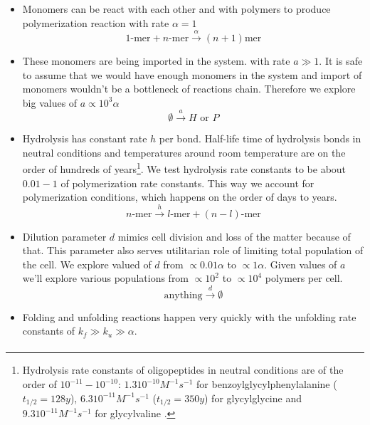 \documentclass[5p,times]{elsarticle}
\newcommand*{\ga}{\alpha}
\begin{document}
\begin{itemize}
 \item Monomers can be react with each other and with polymers to produce polymerization reaction 
with rate 
$\ga = 1$
\begin{equation}
 1\mbox{-mer}+n\mbox{-mer} \xrightarrow{\ga} (n+1)\mbox{mer}
\end{equation}
\item These monomers are being imported in the system. with rate $a\gg1$. It is safe to assume 
that 
we would have enough monomers in the system and import of monomers wouldn't be a bottleneck of 
reactions chain. Therefore we explore big values of $a\propto 10^3\ga$
\begin{equation}
 \emptyset \xrightarrow{a} H\,\,\mbox{or}\,\,P
\end{equation}
\item Hydrolysis has constant rate $h$ per bond. Half-life time of hydrolysis bonds in neutral 
conditions and temperatures around room temperature are on the order of hundreds of 
years\footnote{Hydrolysis rate constants of oligopeptides in 
neutral conditions are of the order of $10^{-11}-10^{-10}$: $1.3  10^{-10} M^{-1}s^{-1} $ 
for benzoylglycylphenylalanine ($t_{1/2} = 128 y$)\cite{Bryant1996}, $6.3  10^{-11} M^{-1} s^{-1}$
($t_{1/2}=350 y$) for glycylglycine and $9.3 10^{-11}M^{-1} s^{-1}$ for glycylvaline
\cite{Smith1998}.}. We test hydrolysis rate constants to be about $0.01-1$ of polymerization rate 
constants. This way we account for polymerization conditions, which happens on the order of days 
to years.
\begin{equation}
 n\mbox{-mer} \xrightarrow{h} l\mbox{-mer}+(n-l)\mbox{-mer}
\end{equation}
\item Dilution parameter $d$ mimics cell division and loss of the matter because of that. 
This parameter also serves utilitarian role of limiting total population of the cell. We explore 
valued of $d$ from $\propto 0.01\ga$ to $\propto 1\ga$. Given values of $a$ we'll explore various 
populations from $\propto 10^2$ to $\propto 10^4$ polymers per 
cell.
\begin{equation}
 \mbox{anything} \xrightarrow{d}\emptyset
\end{equation}
\item Folding and unfolding reactions happen very quickly with 
the unfolding rate constants of $k_f\gg k_{u}\gg\ga$. 
\begin{equation}
\begin{split}

\end{split}
\end{equation}
\end{itemize}
\end{document}
